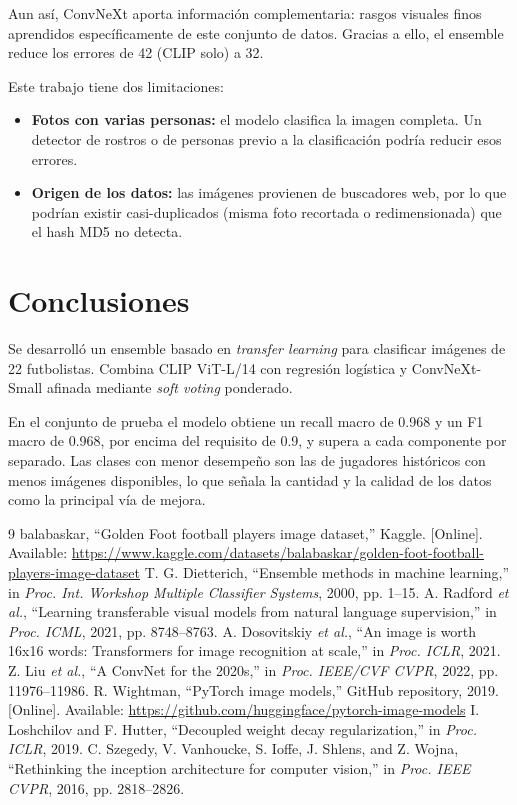 \documentclass[journal]{IEEEtran}
\begin{document}
Aun así, ConvNeXt aporta información complementaria: rasgos visuales finos aprendidos específicamente de este conjunto de datos. Gracias a ello, el ensemble reduce los errores de 42 (CLIP solo) a 32.

Este trabajo tiene dos limitaciones:
\begin{itemize}
\item \textbf{Fotos con varias personas:} el modelo clasifica la imagen completa. Un detector de rostros o de personas previo a la clasificación podría reducir esos errores.
\item \textbf{Origen de los datos:} las imágenes provienen de buscadores web, por lo que podrían existir casi-duplicados (misma foto recortada o redimensionada) que el hash MD5 no detecta.
\end{itemize}

\section{Conclusiones}
Se desarrolló un ensemble basado en \textit{transfer learning} para clasificar imágenes de 22 futbolistas. Combina CLIP ViT-L/14 con regresión logística y ConvNeXt-Small afinada mediante \textit{soft voting} ponderado.

En el conjunto de prueba el modelo obtiene un recall macro de 0.968 y un F1 macro de 0.968, por encima del requisito de 0.9, y supera a cada componente por separado. Las clases con menor desempeño son las de jugadores históricos con menos imágenes disponibles, lo que señala la cantidad y la calidad de los datos como la principal vía de mejora.

\begin{thebibliography}{9}
 balabaskar, ``Golden Foot football players image dataset,'' Kaggle. [Online]. Available: \url{https://www.kaggle.com/datasets/balabaskar/golden-foot-football-players-image-dataset}
 T. G. Dietterich, ``Ensemble methods in machine learning,'' in \textit{Proc. Int. Workshop Multiple Classifier Systems}, 2000, pp. 1--15.
 A. Radford \textit{et al.}, ``Learning transferable visual models from natural language supervision,'' in \textit{Proc. ICML}, 2021, pp. 8748--8763.
 A. Dosovitskiy \textit{et al.}, ``An image is worth 16x16 words: Transformers for image recognition at scale,'' in \textit{Proc. ICLR}, 2021.
 Z. Liu \textit{et al.}, ``A ConvNet for the 2020s,'' in \textit{Proc. IEEE/CVF CVPR}, 2022, pp. 11976--11986.
 R. Wightman, ``PyTorch image models,'' GitHub repository, 2019. [Online]. Available: \url{https://github.com/huggingface/pytorch-image-models}
 I. Loshchilov and F. Hutter, ``Decoupled weight decay regularization,'' in \textit{Proc. ICLR}, 2019.
 C. Szegedy, V. Vanhoucke, S. Ioffe, J. Shlens, and Z. Wojna, ``Rethinking the inception architecture for computer vision,'' in \textit{Proc. IEEE CVPR}, 2016, pp. 2818--2826.
\end{thebibliography}
\end{document}
